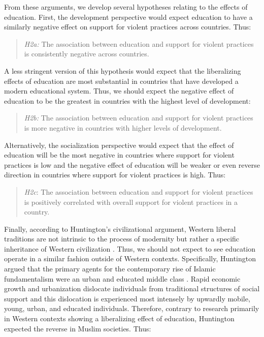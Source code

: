 \documentclass[10pt,letterpaper]{article}
\begin{document}
From these arguments, we develop several hypotheses relating to the effects of education. First, the development perspective would expect education to have a similarly negative effect on support for violent practices across countries. Thus:

\begin{quote}
\emph{H2a:} The association between education and support for violent practices is consistently negative across countries.
\end{quote}

A less stringent version of this hypothesis would expect that the liberalizing effects of education are most substantial in countries that have developed a modern educational system. Thus, we should expect the negative effect of education to be the greatest in countries with the highest level of development:

\begin{quote}
\emph{H2b:} The association between education and support for violent practices is more negative in countries with higher levels of development.
\end{quote}

Alternatively, the socialization perspective would expect that the effect of education will be the most negative in countries where support for violent practices is low and the negative effect of education will be weaker or even reverse direction in countries where support for violent practices is high. Thus:

\begin{quote}
\emph{H2c}: The association between education and support for violent practices is positively correlated with overall support for violent practices in a country.
\end{quote}

Finally, according to Huntington's civilizational argument, Western liberal traditions are not intrinsic to the process of modernity but rather a specific inheritance of Western civilization \cite{huntington_clash_1996}. Thus, we should not expect to see education operate in a similar fashion outside of Western contexts. Specifically, Huntington argued that the primary agents for the contemporary rise of Islamic fundamentalism were an urban and educated middle class \cite{huntington_clash_1996}. Rapid economic growth and urbanization dislocate individuals from traditional structures of social support and this dislocation is experienced most intensely by upwardly mobile, young, urban, and educated individuals. Therefore, contrary to research primarily in Western contexts showing a liberalizing effect of education, Huntington expected the reverse in Muslim societies. Thus:
\end{document}
